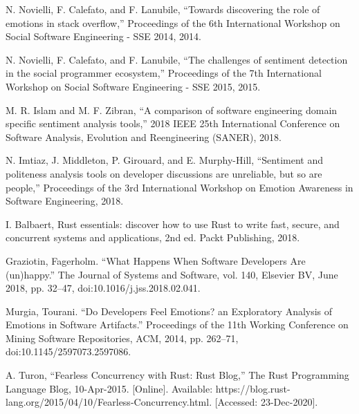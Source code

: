 \documentclass[conference]{IEEEtran}
\begin{document}
\begin{thebibliography}{00}
 N. Novielli, F. Calefato, and F. Lanubile, “Towards discovering the role of emotions in stack overflow,” Proceedings of the 6th International Workshop on Social Software Engineering - SSE 2014, 2014. 

 N. Novielli, F. Calefato, and F. Lanubile, “The challenges of sentiment detection in the social programmer ecosystem,” Proceedings of the 7th International Workshop on Social Software Engineering - SSE 2015, 2015. 

 M. R. Islam and M. F. Zibran, “A comparison of software engineering domain specific sentiment analysis tools,” 2018 IEEE 25th International Conference on Software Analysis, Evolution and Reengineering (SANER), 2018. 

 N. Imtiaz, J. Middleton, P. Girouard, and E. Murphy-Hill, “Sentiment and politeness analysis tools on developer discussions are unreliable, but so are people,” Proceedings of the 3rd International Workshop on Emotion Awareness in Software Engineering, 2018. 

 I. Balbaert, Rust essentials: discover how to use Rust to write fast, secure, and concurrent systems and applications, 2nd ed. Packt Publishing, 2018. 

 Graziotin, Fagerholm. “What Happens When Software Developers Are (un)happy.” The Journal of Systems and Software, vol. 140, Elsevier BV, June 2018, pp. 32–47, doi:10.1016/j.jss.2018.02.041.

 Murgia, Tourani. “Do Developers Feel Emotions? an Exploratory Analysis of Emotions in Software Artifacts.” Proceedings of the 11th Working Conference on Mining Software Repositories, ACM, 2014, pp. 262–71, doi:10.1145/2597073.2597086.

 A. Turon, “Fearless Concurrency with Rust: Rust Blog,” The Rust Programming Language Blog, 10-Apr-2015. [Online]. Available: https://blog.rust-lang.org/2015/04/10/Fearless-Concurrency.html. [Accessed: 23-Dec-2020]. \\

\end{thebibliography}

\onecolumn
\appendices
\end{document}
